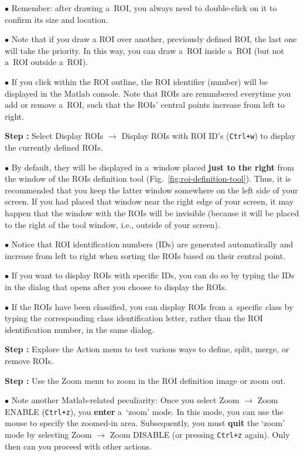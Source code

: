 \documentclass[a4paper, 11pt]{article}
\newcommand{\ttt}[1]{\texttt{#1}}
\newcommand{\lans}[1]{{\color{magenta}#1}}
\newcommand\ra{\rightarrow}
\newcounter{step}
\newcommand\s{\addtocounter{step}{1}\vskip5pt\noindent\textbf{Step \thestep:}{ }}
\newcommand\bul{\vskip5pt\noindent$\bullet${ }}
\newcommand\bb[1]{\textbf{#1}}
\begin{document}
\bul Remember: after drawing a~ROI, you always need to double-click on it to confirm its size and location.

\bul Note that if you draw a ROI over another, previously defined ROI, the last one will take the priority. In this way, you can draw a~ROI inside a~ROI (but not a~ROI outside a~ROI).

\bul If you click within the ROI outline, the ROI identifier (number) will be displayed in the Matlab console. Note that ROIs are renumbered everytime you add or remove a~ROI, such that the ROIs' central points increase from left to right.

\s Select \lans{Display ROIs} $\ra$ \lans{Display ROIs with ROI ID's} (\ttt{Ctrl+w}) to display the currently defined ROIs.

\bul By default, they will be displayed in a~window placed \bb{just to the right} from the window of the ROIs definition tool (Fig.~\ref{fig:roi-definition-tool}). Thus, it is recommended that you keep the latter window somewhere on the left side of your screen. If you had placed that window near the right edge of your screen, it may happen that the window with the ROIs will be invisible (because it will be placed to the right of the tool window, i.e., outside of your screen).

\bul Notice that ROI identification numbers (IDs) are generated automatically and increase from left to right when sorting the ROIs based on their central point.

\bul If you want to display ROIs with specific IDs, you can do so by typing the IDs in the dialog that opens after you choose to display the ROIs.

\bul If the ROIs have been classified, you can display ROIs from a~specific class by typing the corresponding class identification letter, rather than the ROI identification number, in the same dialog.

\s Explore the \lans{Action} menu to test various ways to \lans{define}, \lans{split}, \lans{merge}, or \lans{remove} ROIs.

\s Use the \lans{Zoom} menu to zoom in the ROI definition image or zoom out.

\bul Note another Matlab-related peculiarity: Once you select \lans{Zoom} $\ra$ \lans{Zoom ENABLE} (\ttt{Ctrl+z}), you \bb{enter} a~`zoom' mode. In this mode, you can use the mouse to specify the zoomed-in area. Subsequently, you must \bb{quit} the `zoom' mode by selecting \lans{Zoom} $\ra$ \lans{Zoom DISABLE} (or pressing \ttt{Ctrl+z} again). Only then can you proceed with other actions.
\end{document}
